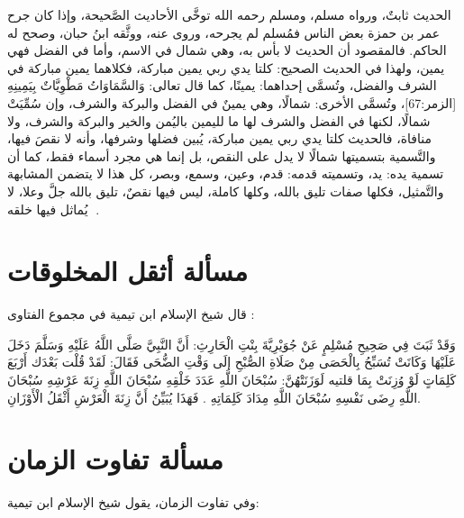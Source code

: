 الحديث ثابتٌ، ورواه مسلم، ومسلم رحمه الله توخَّى الأحاديث الصَّحيحة، وإذا كان جرح عمر بن حمزة بعض الناس فمُسلم لم يجرحه، وروى عنه، ووثَّقه ابنُ حبان، وصحح له الحاكم.
فالمقصود أن الحديث لا بأس به، وهي شمال في الاسم، وأما في الفضل فهي يمين، ولهذا في الحديث الصحيح: كلتا يدي ربي يمين مباركة، فكلاهما يمين مباركة في الشرف والفضل، وتُسمَّى إحداهما: يمينًا، كما قال تعالى: وَالسَّمَاوَاتُ مَطْوِيَّاتٌ بِيَمِينِهِ [الزمر:67]، وتُسمَّى الأخرى: شمالًا، وهي يمينٌ في الفضل والبركة والشرف، وإن سُمِّيَتْ شمالًا، لكنها في الفضل والشرف لها ما لليمين باليُمن والخير والبركة والشرف، ولا منافاة، فالحديث كلتا يدي ربي يمين مباركة، يُبين فضلها وشرفها، وأنه لا نقصَ فيها، والتَّسمية بتسميتها شمالًا لا يدل على النقص، بل إنما هي مجرد أسماء فقط، كما أن تسمية يده: يد، وتسميته قدمه: قدم، وعين، وسمع، وبصر، كل هذا لا يتضمن المشابهة والتَّمثيل، فكلها صفات تليق بالله، وكلها كاملة، ليس فيها نقصٌ، تليق بالله جلَّ وعلا، لا يُماثل فيها خلقه .

\section{مسألة أثقل المخلوقات}

قال شيخ الإسلام ابن تيمية في مجموع الفتاوى \href{https://shamela.ws/book/7289/2991#p1}{\faExternalLink}:

وَقَدْ ثَبَتَ فِي صَحِيحِ مُسْلِمٍ {عَنْ جُوَيْرِيَّةَ بِنْتِ الْحَارِثِ: أَنَّ النَّبِيَّ صَلَّى اللَّهُ عَلَيْهِ وَسَلَّمَ دَخَلَ عَلَيْهَا وَكَانَتْ تُسَبِّحُ بِالْحَصَى مِنْ صَلَاةِ الصُّبْحِ إلَى وَقْتِ الضُّحَى فَقَالَ: لَقَدْ قُلْت بَعْدَك أَرْبَعَ كَلِمَاتٍ لَوْ وُزِنَتْ بِمَا قلتيه لَوَزَنَتْهُنَّ: سُبْحَانَ اللَّهِ عَدَدَ خَلْقِهِ سُبْحَانَ اللَّهِ زِنَةَ عَرْشِهِ سُبْحَانَ اللَّهِ رِضَى نَفْسِهِ سُبْحَانَ اللَّهِ مِدَادَ كَلِمَاتِهِ} . فَهَذَا يُبَيِّنُ أَنَّ زِنَةَ الْعَرْشِ أَثْقَلُ الْأَوْزَانِ.

\section{مسألة تفاوت الزمان}


وفي تفاوت الزمان، يقول شيخ الإسلام ابن تيمية:

